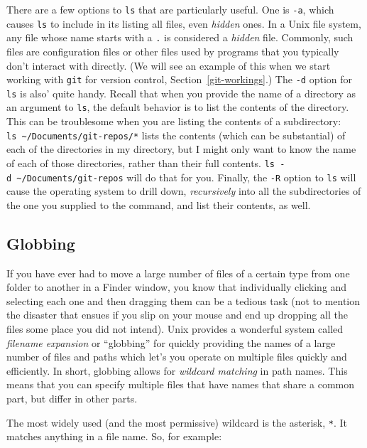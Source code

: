 \documentclass[]{krantz}
\begin{document}
There are a few options to \texttt{ls} that are particularly useful. One is \texttt{-a}, which causes
\texttt{ls} to include in its listing all files, even \emph{hidden} ones. In a Unix file system,
any file whose name starts with a \texttt{.} is considered a \emph{hidden} file. Commonly, such
files are configuration files or other files used by programs that you typically
don't interact with directly. (We will see an example of this when we start working with \texttt{git} for version control, Section~\ref{git-workings}.) The \texttt{-d} option for \texttt{ls} is also'
quite handy. Recall that when you provide the name of a directory as an argument to \texttt{ls},
the default behavior is to list the contents of the directory. This can be troublesome
when you are listing the contents of a subdirectory: \texttt{ls\ \textasciitilde{}/Documents/git-repos/*} lists the
contents (which can be substantial) of each of the directories in my directory, but
I might only want to know the name of each of those directories, rather than their full contents.
\texttt{ls\ -d\ \textasciitilde{}/Documents/git-repos} will do that for you. Finally, the \texttt{-R} option to \texttt{ls} will cause the operating system to drill down, \emph{recursively} into all the subdirectories of the one you
supplied to the command, and list their contents, as well.

\hypertarget{globbing}{%
\subsection{Globbing}\label{globbing}}

If you have ever had to move a large number of files of a certain type from
one folder to another in a Finder window, you know that individually clicking and
selecting each one and then dragging them can be a tedious task (not to mention the disaster
that ensues if you slip on your mouse and end up dropping all the files some place
you did not intend). Unix provides a wonderful system called \emph{filename expansion} or
``globbing'' for quickly providing the names of a large number of files and paths which let's
you operate on multiple files quickly and efficiently. In short, globbing allows for
\emph{wildcard matching} in path names. This means that you can
specify multiple files that have names that share a common part, but differ in other parts.

The most widely used (and the most permissive) wildcard is the asterisk, \texttt{*}. It matches
anything in a file name. So, for example:
\end{document}
